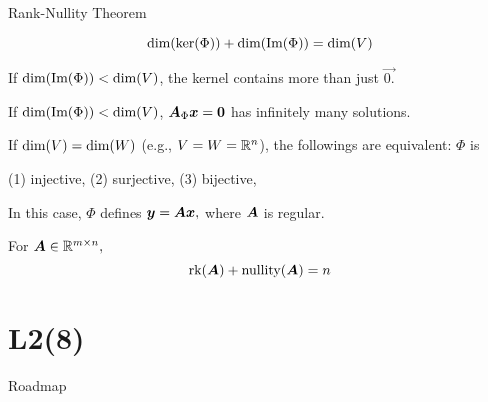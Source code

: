 \documentclass[fleqn,aspectratio=169]{beamer}
\begin{document}
\begin{frame}{Rank-Nullity Theorem}

\plitemsep 0.07in
{
\plitemsep 0.07in
\thm 
$$\text{dim}(\ker(\Phi)) + \text{dim}(\text{Im}(\Phi)) = \text{dim}(V)$$
\vspace{-0.5cm}
\small
\bci 
\item If $\text{dim}(\text{Im}(\Phi)) < \text{dim}(V)$, the kernel contains more than just $\vec{0.}$
\item If $\text{dim}(\text{Im}(\Phi)) < \text{dim}(V)$, $\bm{A}_{\Phi} \bm{x} = \bm{0}$ has infinitely many solutions.

\item If $\text{dim}(V) = \text{dim}(W)$ (e.g., $V=W={\mathbb R}^n$), the followings are equivalent: $\Phi$ is
\plitemsep 0.01in
\bci
\item (1) injective, (2) surjective, (3) bijective, 

\item In this case, $\Phi$ defines $\bm{y} = \bm{A}\bm{x},$ where $\bm{A}$ is regular. 
\eci

\item {} For $\bm{A} \in {\mathbb R}^{m \times n},$
$$
\text{rk}(\bm{A}) + \text{nullity}(\bm{A}) = n
$$
\eci
}
{
\centering
{}
}
\end{frame}


\section{L2(8)}
\begin{frame}{Roadmap}

\plitemsep 0.1in

\bce[(1)] 
\item {}

\item {}

\ece
\end{frame}
\end{document}
